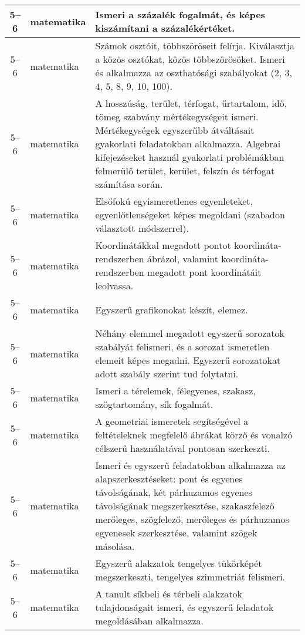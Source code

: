 \begin{small}
\begin{longtable}{c | p{2cm} |  p{11cm} }
              5--6 & matematika & Ismeri a százalék fogalmát, és képes kiszámítani a százalékértéket. \\ \hline
              5--6 & matematika & Számok osztóit, többszöröseit felírja. Kiválasztja a közös osztókat, közös többszörösöket. Ismeri és alkalmazza az oszthatósági szabályokat (2, 3, 4, 5, 8, 9, 10, 100). \\ \hline
              5--6 & matematika & A hosszúság, terület, térfogat, űrtartalom, idő, tömeg szabvány mértékegységeit ismeri. Mértékegységek egyszerűbb átváltásait gyakorlati feladatokban alkalmazza. Algebrai kifejezéseket használ gyakorlati problémákban felmerülő  terület, kerület, felszín és térfogat számítása során. \\ \hline
              5--6 & matematika & Elsőfokú egyismeretlenes egyenleteket, egyenlőtlenségeket képes megoldani (szabadon választott módszerrel). \\ \hline
              5--6 & matematika & Koordinátákkal megadott pontot koordináta-rendszerben ábrázol, valamint koordináta-rendszerben megadott pont koordinátáit leolvassa. \\ \hline
              5--6 & matematika & Egyszerű grafikonokat készít, elemez. \\ \hline
              5--6 & matematika & Néhány elemmel megadott egyszerű sorozatok szabályát felismeri, és a sorozat ismeretlen elemeit képes megadni. Egyszerű sorozatokat adott szabály szerint tud folytatni. \\ \hline
              5--6 & matematika & Ismeri a térelemek, félegyenes, szakasz, szögtartomány, sík fogalmát. \\ \hline
              5--6 & matematika & A geometriai ismeretek segítségével a feltételeknek megfelelő ábrákat körző és vonalzó célszerű használatával pontosan szerkeszti. \\ \hline
              5--6 & matematika & Ismeri és egyszerű feladatokban alkalmazza az alapszerkesztéseket: pont és egyenes távolságának, két párhuzamos egyenes távolságának megszerkesztése, szakaszfelező merőleges, szögfelező, merőleges és párhuzamos egyenesek szerkesztése, valamint szögek másolása. \\ \hline
              5--6 & matematika & Egyszerű alakzatok tengelyes tükörképét megszerkeszti, tengelyes szimmetriát felismeri. \\ \hline
              5--6 & matematika & A tanult síkbeli és térbeli alakzatok tulajdonságait ismeri, és egyszerű feladatok megoldásában alkalmazza. \\ \hline

\end{longtable}
\end{small}
